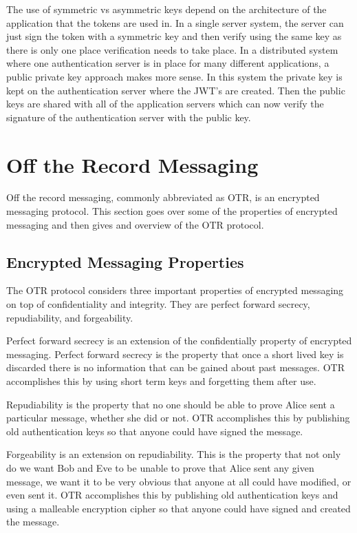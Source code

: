 The use of symmetric vs asymmetric keys depend on the architecture of the application that the tokens are used in. In a single server system, the server can just sign the token with a symmetric key and then verify using the same key as there is only one place verification needs to take place. In a distributed system where one authentication server is in place for many different applications, a public private key approach makes more sense. In this system the private key is kept on the authentication server where the JWT’s are created. Then the public keys are shared with all of the application servers which can now verify the signature of the authentication server with the public key.


\section{Off the Record Messaging}


Off the record messaging, commonly abbreviated as OTR, is an encrypted messaging protocol. This section goes over some of the properties of encrypted messaging and then gives and overview of the OTR protocol.


\subsection{Encrypted Messaging Properties}


The OTR protocol considers three important properties of encrypted messaging on top of confidentiality and integrity. They are perfect forward secrecy, repudiability, and forgeability.\cite{otr-paper}


Perfect forward secrecy is an extension of the confidentially property of encrypted messaging. Perfect forward secrecy is the property that once a short lived key is discarded there is no information that can be gained about past messages. OTR accomplishes this by using short term keys and forgetting them after use. 


Repudiability is the property that no one should be able to prove Alice sent a particular message, whether she did or not. OTR accomplishes this by publishing old authentication keys so that anyone could have signed the message.


Forgeability is an extension on repudiability. This is the property that not only do we want Bob and Eve to be unable to prove that Alice sent any given message, we want it to be very obvious that anyone at all could have modified, or even sent it. OTR accomplishes this by publishing old authentication keys and using a malleable encryption cipher so that anyone could have signed and created the message.


